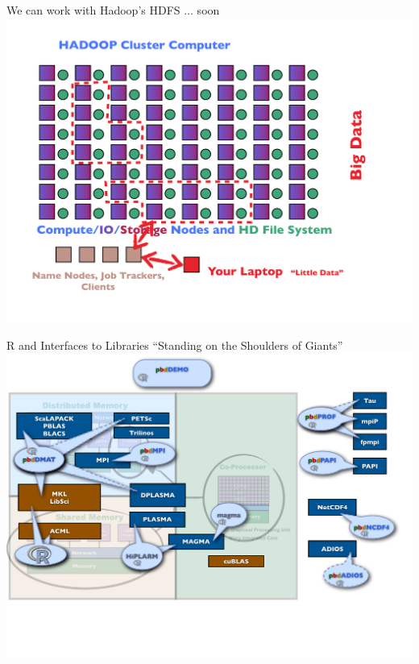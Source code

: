 \begin{frame}{We can work with Hadoop's HDFS $\ldots$ soon}
  \includegraphics[width=1.25\textheight]
  {../common/pics/hardware/ParallelHardware23.pdf}
\end{frame}

\begin{frame}{R and \pbdR Interfaces to Libraries ``Standing on the Shoulders of
  Giants''}
\includegraphics[width=1.35\textheight]
{../common/pics/hardware/ParallelHardware14.pdf}
\end{frame}


